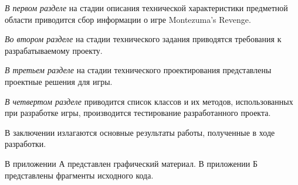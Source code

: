 \emph{В первом разделе} на стадии описания технической характеристики предметной области приводится сбор информации о игре Montezuma’s Revenge.

\emph{Во втором разделе} на стадии технического задания приводятся требования к разрабатываемому проекту.

\emph{В третьем разделе} на стадии технического проектирования представлены проектные решения для игры.

\emph{В четвертом разделе} приводится список классов и их методов, использованных при разработке игры, производится тестирование разработанного проекта.

В заключении излагаются основные результаты работы, полученные в ходе разработки.

В приложении А представлен графический материал.
В приложении Б представлены фрагменты исходного кода. 
